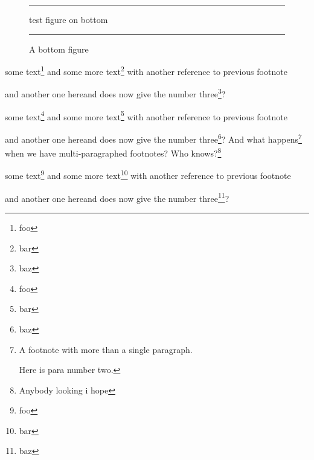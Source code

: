 \documentclass{report}
\newcommand\Afigure{\begin{figure}[b]
\hrule
test figure on bottom
\hrule
\caption{A bottom figure}
\end{figure}}
\begin{document}
\Afigure

some text\footnote{foo} and some more text\footnote{bar} with another
reference to previous
footnote\addtocounter{footnote}{-1}\footnotemark{}
and another one here
and does now give the number three\footnote{baz}?

\clearpage


some text\footnote{foo} and some more text\footnote{bar} with another
reference to previous
footnote\addtocounter{footnote}{-1}\footnotemark{}
and another one here
and does now give the number three\footnote{baz}?
And what happens\footnote{A footnote with more than a single
paragraph.\par Here is para number two.} when we have
multi-paragraphed footnotes? Who knows?\footnote{Anybody looking i hope}

\clearpage


some text\footnote{foo} and some more text\footnote{bar} with another
reference to previous
footnote\addtocounter{footnote}{-1}\footnotemark{}
and another one here
and does now give the number three\footnote{baz}?
\end{document}

